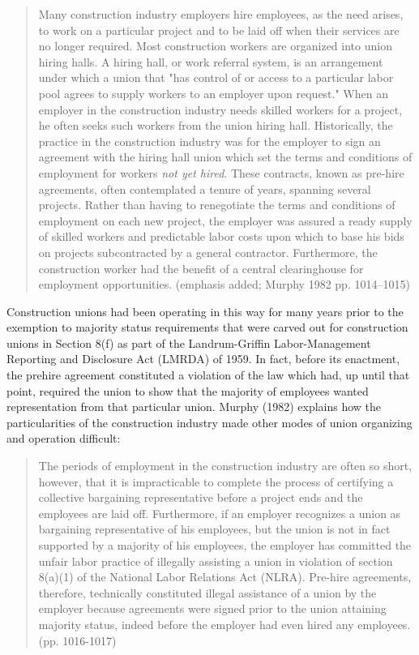 \begin{quote}
Many construction industry employers hire employees, as the need arises, to work on a particular project and to be laid off when their services are no longer required. Most construction workers are organized into union hiring halls. A hiring hall, or work referral system, is an arrangement under which a union that "has control of or access to a particular labor pool agrees to supply workers to an employer upon request." When an employer in the construction industry needs skilled workers for a project, he often seeks such workers from the union hiring hall. Historically, the practice in the construction industry was for the employer to sign an agreement with the hiring hall union which set the terms and conditions of employment for workers \textit{not yet hired}. These contracts, known as pre-hire agreements, often contemplated a tenure of years, spanning several projects. Rather than having to renegotiate the terms and conditions of employment on each new project, the employer was assured a ready supply of skilled workers and predictable labor costs upon which to base his bids on projects subcontracted by a general contractor. Furthermore, the construction worker had the benefit of a central clearinghouse for employment opportunities. (emphasis added; Murphy 1982 pp. 1014–1015)
\end{quote}

Construction unions had been operating in this way for many years prior to the exemption to majority status requirements that were carved out for construction unions in Section 8(f) as part of the Landrum-Griffin Labor-Management Reporting and Disclosure Act (LMRDA) of 1959. In fact, before its enactment, the prehire agreement constituted a violation of the law which had, up until that point, required the union to show that the majority of employees wanted representation from that particular union. Murphy (1982) explains how the particularities of the construction industry made other modes of union organizing and operation difficult:

\begin{quote}
	The periods of employment in the construction industry are often so short, however, that it is impracticable to complete the process of certifying a collective bargaining representative before a project ends and the employees are laid off. Furthermore, if an employer recognizes a union as bargaining representative of his employees, but the union is not in fact supported by a majority of his employees, the employer has committed the unfair labor practice of illegally assisting a union in violation of section 8(a)(1) of the National Labor Relations Act (NLRA). Pre-hire agreements, therefore, technically constituted illegal assistance of a union by the employer because agreements were signed prior to the union attaining majority status, indeed before the employer had even hired any employees. (pp. 1016-1017)
\end{quote}

